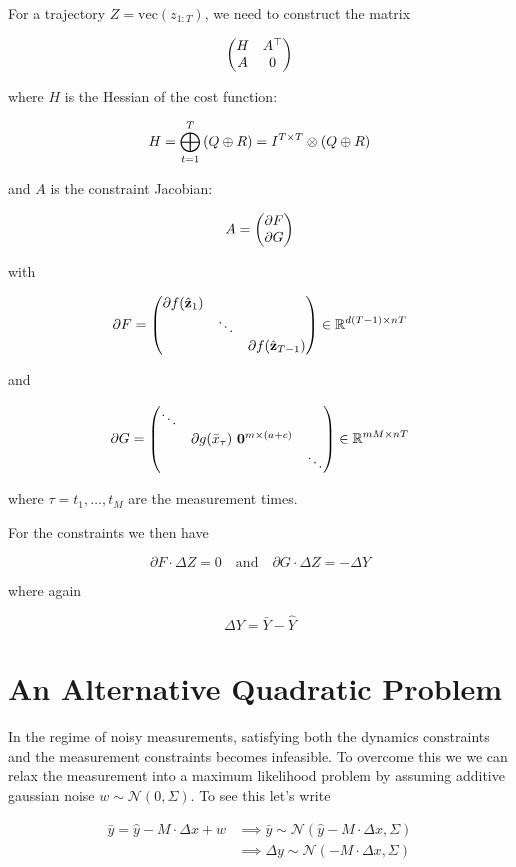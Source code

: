 \documentclass{article}
\begin{document}
For a trajectory $Z = \text{vec}(z_{1:T})$, we need to construct the matrix

$$
\mqty(
  H & A^\top \\
  A & 0
)
$$


where $H$ is the Hessian of the cost function:

$$
H = \bigoplus_{t=1}^T \qty(Q \oplus R) = I^{T \times T} \otimes \qty(Q \oplus R)
$$


and $A$ is the constraint Jacobian:

$$
A = \mqty(
  \partial F \\
  \partial G
)
$$

with 

$$
\partial F = \mqty(
  \partial f(\hat{\vb{z}}_1) \\
  & \ddots \\
  & & \partial f(\hat{\vb{z}}_{T-1})
) \in \mathbb{R}^{d (T - 1) \times n T}
$$

and

$$
\partial G = \mqty(
  \ddots \\
  & \partial g(\bar x_{\tau}) \ \vb{0}^{m \times (a + c)} \\
  & & \ddots
) \in \mathbb{R}^{m M \times n T}
$$

where $\tau = t_1, \dots, t_M$ are the measurement times.

\hfill

For the constraints we then have

$$
\partial F \cdot \Delta Z = 0
\quad \text{and} \quad
\partial G \cdot \Delta Z = - \Delta Y
$$

where again

$$
\Delta Y = \bar Y - \hat Y
$$

\section*{An Alternative Quadratic Problem}

In the regime of noisy measurements, satisfying both the dynamics constraints and the measurement constraints becomes infeasible. To overcome this we we can relax the measurement into a maximum likelihood problem by assuming additive gaussian noise $w \sim \mathcal{N}(0, \Sigma)$.  To see this let's write

\begin{align*}
\bar y = \hat y - M \cdot \Delta x + w &\implies \bar y \sim \mathcal{N}(\hat y - M \cdot \Delta x, \Sigma) \\ 
&\implies \Delta y \sim \mathcal{N}(-M \cdot \Delta x, \Sigma) \\
\end{align*}
\end{document}
